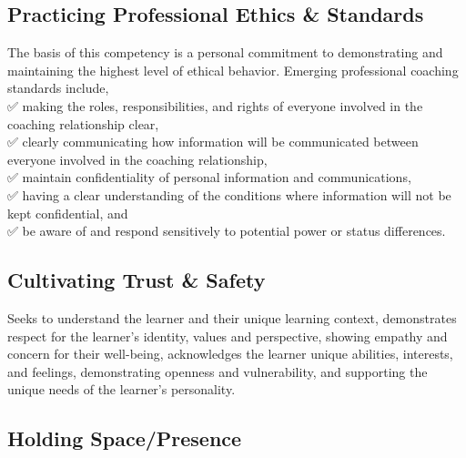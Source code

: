 \documentclass[
]{book}
\begin{document}
\hypertarget{practicing-professional-ethics-standards}{%
\subsection*{\texorpdfstring{\textbf{Practicing Professional Ethics \& Standards}}{Practicing Professional Ethics \& Standards}}\label{practicing-professional-ethics-standards}}

The basis of this competency is a personal commitment to demonstrating and maintaining the highest level of ethical behavior. Emerging professional coaching standards include,\\
✅ making the roles, responsibilities, and rights of everyone involved in the coaching relationship clear,\\
✅ clearly communicating how information will be communicated between everyone involved in the coaching relationship,\\
✅ maintain confidentiality of personal information and communications,\\
✅ having a clear understanding of the conditions where information will not be kept confidential, and\\
✅ be aware of and respond sensitively to potential power or status differences.

\hypertarget{cultivating-trust-safety}{%
\subsection*{Cultivating Trust \& Safety}\label{cultivating-trust-safety}}

Seeks to understand the learner and their unique learning context, demonstrates respect for the learner's identity, values and perspective, showing empathy and concern for their well-being, acknowledges the learner unique abilities, interests, and feelings, demonstrating openness and vulnerability, and supporting the unique needs of the learner's personality.

\hypertarget{holding-spacepresence}{%
\subsection*{Holding Space/Presence}\label{holding-spacepresence}}
\end{document}
